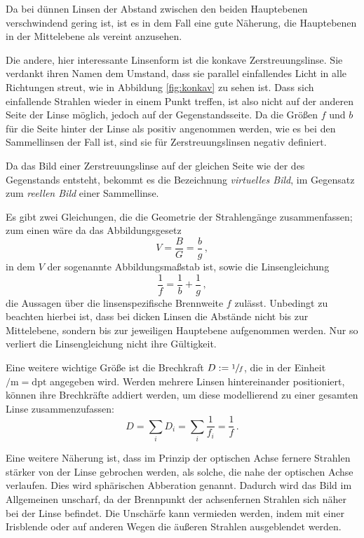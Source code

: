 Da bei dünnen Linsen der Abstand zwischen den beiden Hauptebenen verschwindend gering ist, ist es in dem Fall eine gute Näherung, 
die Hauptebenen in der Mittelebene als vereint anzusehen.  

Die andere, hier interessante Linsenform ist die konkave Zerstreuungslinse. Sie verdankt ihren Namen dem Umstand, dass 
sie parallel einfallendes Licht in alle Richtungen streut, wie in Abbildung \ref{fig:konkav} zu sehen ist. 
Dass sich einfallende Strahlen wieder in einem Punkt treffen, ist also nicht auf der anderen Seite der Linse möglich, jedoch 
auf der Gegenstandsseite. Da die Größen $f$ und $b$ für die Seite hinter der Linse als positiv angenommen werden, 
wie es bei den Sammellinsen der Fall ist, sind sie für Zerstreuungslinsen negativ definiert. 

Da das Bild einer Zerstreuungslinse auf der gleichen Seite wie der des Gegenstands entsteht, bekommt es die Bezeichnung 
\textit{virtuelles Bild}, im Gegensatz zum \textit{reellen Bild} einer Sammellinse\cite{Versuchsanleitung}. 

Es gibt zwei Gleichungen, die die Geometrie der Strahlengänge zusammenfassen; zum einen wäre da das Abbildungsgesetz 
\begin{equation}
    V=\frac{B}{G}=\frac{b}{g}\,,
    \label{eqn:Abbildungsgesetz}
\end{equation}
in dem $V$ der sogenannte Abbildungsmaßstab ist, sowie die Linsengleichung 
\begin{equation}
    \frac{1}{f}=\frac{1}{b}+\frac{1}{g}\,,
    \label{eqn:Linsengleichung}
\end{equation}
die Aussagen über die linsenspezifische Brennweite $f$ zulässt. 
Unbedingt zu beachten hierbei ist, dass bei dicken Linsen die Abstände nicht bis zur Mittelebene, sondern bis zur jeweiligen 
Hauptebene aufgenommen werden. Nur so verliert die Linsengleichung nicht ihre Gültigkeit\cite{Versuchsanleitung}. 

Eine weitere wichtige Größe ist die Brechkraft $D:=\sfrac{1}{f}$, die in der Einheit $\si{\per\meter}=\mathrm{dpt}$ angegeben wird. 
Werden mehrere Linsen hintereinander positioniert, können ihre Brechkräfte addiert werden, um diese modellierend zu einer 
gesamten Linse zusammenzufassen\cite{Versuchsanleitung}: 
\begin{equation*}
    D=\sum_i D_i = \sum_i \frac{1}{f_i}=\frac{1}{f}\,.
\end{equation*}

Eine weitere Näherung ist, dass im Prinzip der optischen Achse fernere Strahlen stärker von der Linse gebrochen werden, als 
solche, die nahe der optischen Achse verlaufen. Dies wird sphärischen Abberation genannt. 
Dadurch wird das Bild im Allgemeinen unscharf, da der Brennpunkt der achsenfernen Strahlen sich näher bei der Linse befindet. 
Die Unschärfe kann vermieden werden, indem mit einer Irisblende oder auf anderen Wegen die äußeren Strahlen ausgeblendet werden. 

